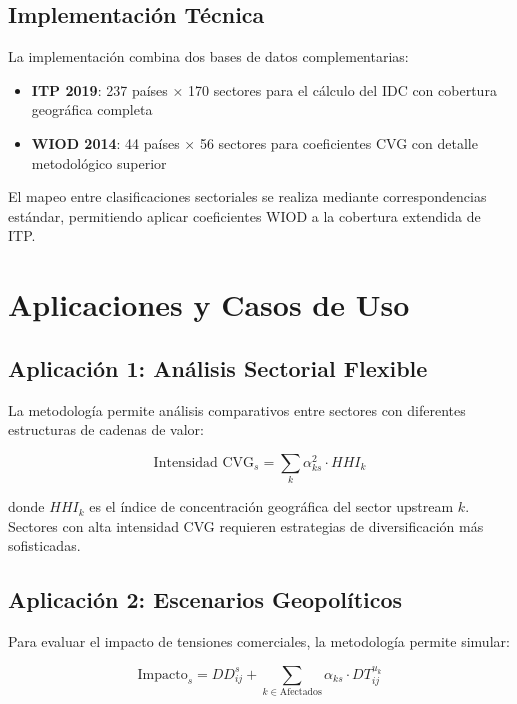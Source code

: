 \documentclass[12pt,a4paper]{article}
\begin{document}
\subsection{Implementación Técnica}

La implementación combina dos bases de datos complementarias:

\begin{itemize}
    \item \textbf{ITP 2019}: 237 países × 170 sectores para el cálculo del IDC con cobertura geográfica completa
    \item \textbf{WIOD 2014}: 44 países × 56 sectores para coeficientes CVG con detalle metodológico superior
\end{itemize}

El mapeo entre clasificaciones sectoriales se realiza mediante correspondencias estándar, permitiendo aplicar coeficientes WIOD a la cobertura extendida de ITP.

\section{Aplicaciones y Casos de Uso}

\subsection{Aplicación 1: Análisis Sectorial Flexible}

La metodología permite análisis comparativos entre sectores con diferentes estructuras de cadenas de valor:

\begin{equation}
\text{Intensidad CVG}_s = \sum_{k} \alpha_{ks}^2 \cdot HHI_k
\end{equation}

donde $HHI_k$ es el índice de concentración geográfica del sector upstream $k$. Sectores con alta intensidad CVG requieren estrategias de diversificación más sofisticadas.

\subsection{Aplicación 2: Escenarios Geopolíticos}

Para evaluar el impacto de tensiones comerciales, la metodología permite simular:

\begin{equation}
\text{Impacto}_{s} = DD_{ij}^s + \sum_{k \in \text{Afectados}} \alpha_{ks} \cdot DT_{ij}^{u_k}
\end{equation}
\end{document}
